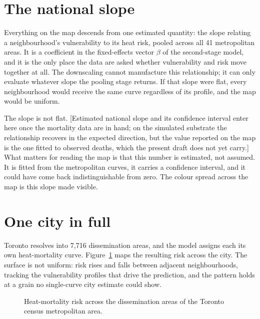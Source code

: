 \section{The national slope}

Everything on the map descends from one estimated quantity: the slope relating a neighbourhood's vulnerability to its heat risk, pooled across all 41 metropolitan areas. It is a coefficient in the fixed-effects vector $\beta$ of the second-stage model, and it is the only place the data are asked whether vulnerability and risk move together at all. The downscaling cannot manufacture this relationship; it can only evaluate whatever slope the pooling stage returns. If that slope were flat, every neighbourhood would receive the same curve regardless of its profile, and the map would be uniform.

The slope is not flat. [Estimated national slope and its confidence interval enter here once the mortality data are in hand; on the simulated substrate the relationship recovers in the expected direction, but the value reported on the map is the one fitted to observed deaths, which the present draft does not yet carry.] What matters for reading the map is that this number is estimated, not assumed. It is fitted from the metropolitan curves, it carries a confidence interval, and it could have come back indistinguishable from zero. The colour spread across the map is this slope made visible.

\section{One city in full}

Toronto resolves into 7,716 dissemination areas, and the model assigns each its own heat-mortality curve. Figure~\ref{fig:toronto} maps the resulting risk across the city. The surface is not uniform: risk rises and falls between adjacent neighbourhoods, tracking the vulnerability profiles that drive the prediction, and the pattern holds at a grain no single-curve city estimate could show.

\begin{figure}[ht]
\centering
\caption{Heat-mortality risk across the dissemination areas of the Toronto census metropolitan area.}
\label{fig:toronto}
\end{figure}

